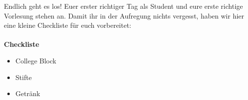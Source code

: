 Endlich geht es los! Euer erster richtiger Tag als Student und eure erste richtige Vorlesung stehen an. Damit ihr in der Aufregung nichts vergesst, haben wir hier eine kleine Checkliste für euch vorbereitet:\\
\\
\textbf{Checkliste}
\begin{itemize}
	\item College Block
	\item Stifte
	\item Getränk
\end{itemize}